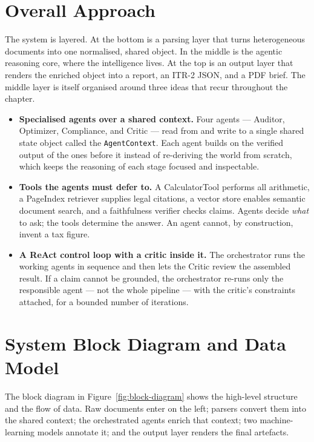\documentclass[12pt, a4paper, oneside]{report}
\begin{document}
\section{Overall Approach}
\label{sec:overall-approach}

The system is layered. At the bottom is a parsing layer that turns
heterogeneous documents into one normalised, shared object. In the middle is the
agentic reasoning core, where the intelligence lives. At the top is an output
layer that renders the enriched object into a report, an ITR-2 JSON, and a PDF
brief. The middle layer is itself organised around three ideas that recur
throughout the chapter.

\begin{itemize}
    \item \textbf{Specialised agents over a shared context.} Four agents ---
          Auditor, Optimizer, Compliance, and Critic --- read from and write to a
          single shared state object called the \texttt{AgentContext}. Each
          agent builds on the verified output of the ones before it instead of
          re-deriving the world from scratch, which keeps the reasoning of each
          stage focused and inspectable.
    \item \textbf{Tools the agents must defer to.} A CalculatorTool performs all
          arithmetic, a PageIndex retriever supplies legal citations, a vector
          store enables semantic document search, and a faithfulness verifier
          checks claims. Agents decide \emph{what} to ask; the tools determine
          the answer. An agent cannot, by construction, invent a tax figure.
    \item \textbf{A ReAct control loop with a critic inside it.} The orchestrator
          runs the working agents in sequence and then lets the Critic review the
          assembled result. If a claim cannot be grounded, the orchestrator
          re-runs only the responsible agent --- not the whole pipeline --- with
          the critic's constraints attached, for a bounded number of iterations.
\end{itemize}

\section{System Block Diagram and Data Model}
\label{sec:block-diagram}

The block diagram in Figure~\ref{fig:block-diagram} shows the high-level
structure and the flow of data. Raw documents enter on the left; parsers convert
them into the shared context; the orchestrated agents enrich that context; two
machine-learning models annotate it; and the output layer renders the final
artefacts.
\end{document}
